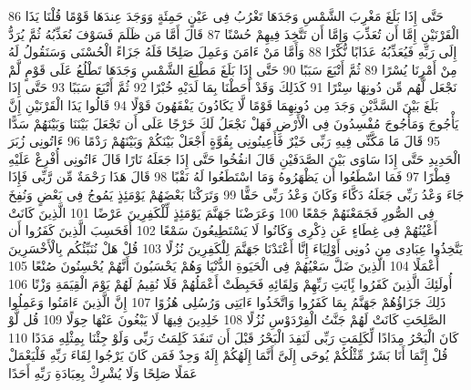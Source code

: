 \documentclass[20pt,a4paper]{article}
\begin{document}
{\tiny\colorbox{cl_aya}{86}} حَتَّى إِذَا بَلَغَ مَغْرِبَ الشَّمْسِ وَجَدَهَا تَغْرُبُ فِى عَيْنٍ حَمِئَةٍ وَوَجَدَ عِندَهَا قَوْمًا قُلْنَا يَذَا الْقَرْنَيْنِ إِمَّا أَن تُعَذِّبَ وَإِمَّا أَن تَتَّخِذَ فِيهِمْ حُسْنًا
{\tiny\colorbox{cl_aya}{87}} قَالَ أَمَّا مَن ظَلَمَ فَسَوْفَ نُعَذِّبُهُ ثُمَّ يُرَدُّ إِلَى رَبِّهِ فَيُعَذِّبُهُ عَذَابًا نُّكْرًا
{\tiny\colorbox{cl_aya}{88}} وَأَمَّا مَنْ ءَامَنَ وَعَمِلَ صَلِحًا فَلَهُ جَزَاءً الْحُسْنَى وَسَنَقُولُ لَهُ مِنْ أَمْرِنَا يُسْرًا
{\tiny\colorbox{cl_aya}{89}} ثُمَّ أَتْبَعَ سَبَبًا
{\tiny\colorbox{cl_aya}{90}} حَتَّى إِذَا بَلَغَ مَطْلِعَ الشَّمْسِ وَجَدَهَا تَطْلُعُ عَلَى قَوْمٍ لَّمْ نَجْعَل لَّهُم مِّن دُونِهَا سِتْرًا
{\tiny\colorbox{cl_aya}{91}} كَذَلِكَ وَقَدْ أَحَطْنَا بِمَا لَدَيْهِ خُبْرًا
{\tiny\colorbox{cl_aya}{92}} ثُمَّ أَتْبَعَ سَبَبًا
{\tiny\colorbox{cl_aya}{93}} حَتَّى إِذَا بَلَغَ بَيْنَ السَّدَّيْنِ وَجَدَ مِن دُونِهِمَا قَوْمًا لَّا يَكَادُونَ يَفْقَهُونَ قَوْلًا
{\tiny\colorbox{cl_aya}{94}} قَالُوا يَذَا الْقَرْنَيْنِ إِنَّ يَأْجُوجَ وَمَأْجُوجَ مُفْسِدُونَ فِى الْأَرْضِ فَهَلْ نَجْعَلُ لَكَ خَرْجًا عَلَى أَن تَجْعَلَ بَيْنَنَا وَبَيْنَهُمْ سَدًّا
{\tiny\colorbox{cl_aya}{95}} قَالَ مَا مَكَّنِّى فِيهِ رَبِّى خَيْرٌ فَأَعِينُونِى بِقُوَّةٍ أَجْعَلْ بَيْنَكُمْ وَبَيْنَهُمْ رَدْمًا
{\tiny\colorbox{cl_aya}{96}} ءَاتُونِى زُبَرَ الْحَدِيدِ حَتَّى إِذَا سَاوَى بَيْنَ الصَّدَفَيْنِ قَالَ انفُخُوا حَتَّى إِذَا جَعَلَهُ نَارًا قَالَ ءَاتُونِى أُفْرِغْ عَلَيْهِ قِطْرًا
{\tiny\colorbox{cl_aya}{97}} فَمَا اسْطَعُوا أَن يَظْهَرُوهُ وَمَا اسْتَطَعُوا لَهُ نَقْبًا
{\tiny\colorbox{cl_aya}{98}} قَالَ هَذَا رَحْمَةٌ مِّن رَّبِّى فَإِذَا جَاءَ وَعْدُ رَبِّى جَعَلَهُ دَكَّاءَ وَكَانَ وَعْدُ رَبِّى حَقًّا
{\tiny\colorbox{cl_aya}{99}} وَتَرَكْنَا بَعْضَهُمْ يَوْمَئِذٍ يَمُوجُ فِى بَعْضٍ وَنُفِخَ فِى الصُّورِ فَجَمَعْنَهُمْ جَمْعًا
{\tiny\colorbox{cl_aya}{100}} وَعَرَضْنَا جَهَنَّمَ يَوْمَئِذٍ لِّلْكَفِرِينَ عَرْضًا
{\tiny\colorbox{cl_aya}{101}} الَّذِينَ كَانَتْ أَعْيُنُهُمْ فِى غِطَاءٍ عَن ذِكْرِى وَكَانُوا لَا يَسْتَطِيعُونَ سَمْعًا
{\tiny\colorbox{cl_aya}{102}} أَفَحَسِبَ الَّذِينَ كَفَرُوا أَن يَتَّخِذُوا عِبَادِى مِن دُونِى أَوْلِيَاءَ إِنَّا أَعْتَدْنَا جَهَنَّمَ لِلْكَفِرِينَ نُزُلًا
{\tiny\colorbox{cl_aya}{103}} قُلْ هَلْ نُنَبِّئُكُم بِالْأَخْسَرِينَ أَعْمَلًا
{\tiny\colorbox{cl_aya}{104}} الَّذِينَ ضَلَّ سَعْيُهُمْ فِى الْحَيَوةِ الدُّنْيَا وَهُمْ يَحْسَبُونَ أَنَّهُمْ يُحْسِنُونَ صُنْعًا
{\tiny\colorbox{cl_aya}{105}} أُولَئِكَ الَّذِينَ كَفَرُوا بَِٔايَتِ رَبِّهِمْ وَلِقَائِهِ فَحَبِطَتْ أَعْمَلُهُمْ فَلَا نُقِيمُ لَهُمْ يَوْمَ الْقِيَمَةِ وَزْنًا
{\tiny\colorbox{cl_aya}{106}} ذَلِكَ جَزَاؤُهُمْ جَهَنَّمُ بِمَا كَفَرُوا وَاتَّخَذُوا ءَايَتِى وَرُسُلِى هُزُوًا
{\tiny\colorbox{cl_aya}{107}} إِنَّ الَّذِينَ ءَامَنُوا وَعَمِلُوا الصَّلِحَتِ كَانَتْ لَهُمْ جَنَّتُ الْفِرْدَوْسِ نُزُلًا
{\tiny\colorbox{cl_aya}{108}} خَلِدِينَ فِيهَا لَا يَبْغُونَ عَنْهَا حِوَلًا
{\tiny\colorbox{cl_aya}{109}} قُل لَّوْ كَانَ الْبَحْرُ مِدَادًا لِّكَلِمَتِ رَبِّى لَنَفِدَ الْبَحْرُ قَبْلَ أَن تَنفَدَ كَلِمَتُ رَبِّى وَلَوْ جِئْنَا بِمِثْلِهِ مَدَدًا
{\tiny\colorbox{cl_aya}{110}} قُلْ إِنَّمَا أَنَا بَشَرٌ مِّثْلُكُمْ يُوحَى إِلَىَّ أَنَّمَا إِلَهُكُمْ إِلَهٌ وَحِدٌ فَمَن كَانَ يَرْجُوا لِقَاءَ رَبِّهِ فَلْيَعْمَلْ عَمَلًا صَلِحًا وَلَا يُشْرِكْ بِعِبَادَةِ رَبِّهِ أَحَدًا
\end{document}
